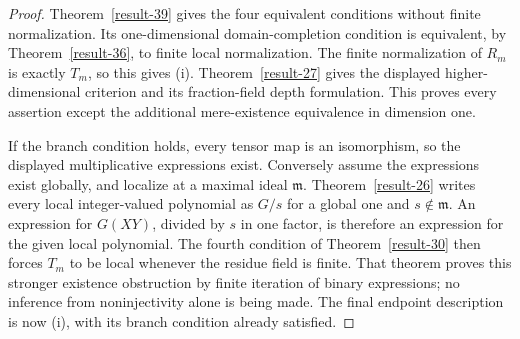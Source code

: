 \documentclass[11pt,a4paper]{article}
\theoremstyle{definition}
\begin{document}
\begin{proof}
Theorem~\ref{result-39} gives the four equivalent conditions without
finite normalization. Its one-dimensional domain-completion condition
is equivalent, by Theorem~\ref{result-36}, to finite local normalization.
The finite normalization of $R_m$ is exactly $T_m$, so this gives (i).
Theorem~\ref{result-27} gives the displayed higher-dimensional criterion
and its fraction-field depth formulation. This proves every assertion
except the additional mere-existence equivalence in dimension one.

If the branch condition holds, every tensor map is an isomorphism,
so the displayed multiplicative expressions exist. Conversely assume
the expressions exist globally, and localize at a maximal ideal
$\mathfrak m$. Theorem~\ref{result-26} writes every local integer-valued
polynomial as $G/s$ for a global one and $s\notin\mathfrak m$.
An expression for $G(XY)$, divided by $s$ in one factor, is therefore
an expression for the given local polynomial. The fourth condition of
Theorem~\ref{result-30} then forces $T_m$ to be local whenever the
residue field is finite. That theorem proves this stronger existence
obstruction by finite iteration of binary expressions; no inference
from noninjectivity alone is being made. The final endpoint description
is now (i), with its branch condition already satisfied.
\end{proof}
\end{document}
